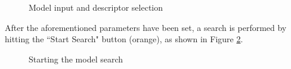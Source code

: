 \documentclass[12pt]{article}
\begin{document}
	\begin{figure}[!h]
		\centering
		\caption{Model input and descriptor selection}
		\label{fig::tut0}
	\end{figure}

	\noindent
	After the aforementioned parameters have been set, a search is performed by hitting the ``Start Search" button (orange), as shown in Figure \ref{fig::tut1}.

	\begin{figure}[!h]
		\centering
		\caption{Starting the model search}
		\label{fig::tut1}
	\end{figure}
\end{document}

